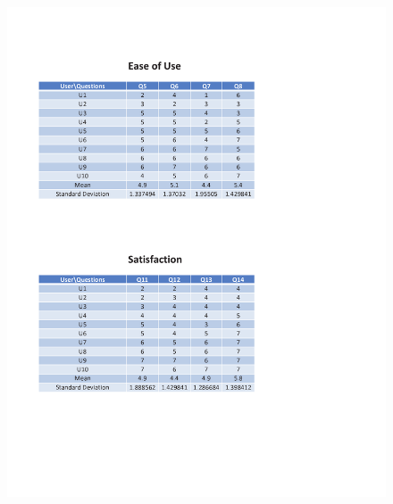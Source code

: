 \begin{appendices}
\begin{figure}[h!t]
    \centering
      \includegraphics[width=6in]{ch5/Result/Desktop/2.pdf}
  \label{fig:Result:EUS:Desktop}
\end{figure}



\end{appendices}
